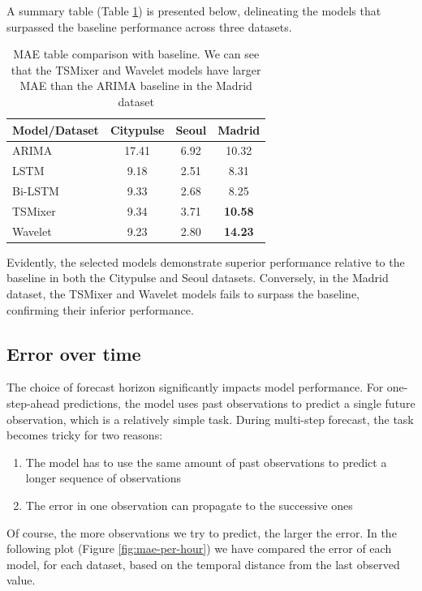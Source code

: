 A summary table (Table \ref{tab:baseline-comparison}) is presented below, delineating the models that surpassed the baseline performance across three datasets.

\begin{table}[]
\centering
\begin{tabular}{lccc}
\toprule
\textbf{Model/Dataset} & \textbf{Citypulse} & \textbf{Seoul} & \textbf{Madrid} \\ 
\midrule
ARIMA \cite{box1970time} & 17.41 & 6.92 & 10.32 \\
LSTM & 9.18 & 2.51 & 8.31 \\
Bi-LSTM & 9.33 & 2.68 & 8.25 \\
TSMixer \cite{chen2023tsmixer} & 9.34 & 3.71 & \textbf{10.58} \\
Wavelet & 9.23 & 2.80 & \textbf{14.23} \\
\bottomrule
\end{tabular}
\caption{MAE table comparison with baseline. We can see that the TSMixer and Wavelet models have larger MAE than the ARIMA baseline in the Madrid dataset}
\label{tab:baseline-comparison}
\end{table}

Evidently, the selected models demonstrate superior performance relative to the baseline in both the Citypulse and Seoul datasets. Conversely, in the Madrid dataset, the TSMixer and Wavelet models fails to surpass the baseline, confirming their inferior performance.

\subsection{Error over time}

The choice of forecast horizon significantly impacts model performance. For one-step-ahead predictions, the model uses past observations to predict a single future observation, which is a relatively simple task. During multi-step forecast, the task becomes tricky for two reasons:
\begin{enumerate}
    \item The model has to use the same amount of past observations to predict a longer sequence of observations
    \item The error in one observation can propagate to the successive ones
\end{enumerate}

Of course, the more observations we try to predict, the larger the error.
In the following plot (Figure \ref{fig:mae-per-hour}) we have compared the error of each model, for each dataset, based on the temporal distance from the last observed value.

